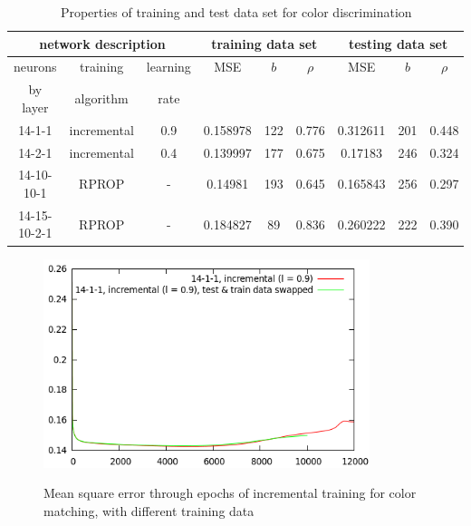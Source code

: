 \documentclass[times, utf8, zavrsni]{fer}
\begin{document}
\begin{table}[h]
\begin{center} {\footnotesize
\begin{tabular}{|c|c|c||c|c|c||c|c|c|}
\hline
\multicolumn{3}{|c||}{network description} & 
\multicolumn{3}{c||}{training data set} & 
\multicolumn{3}{c|}{testing data set} \\
\hline
neurons & training & learning & MSE & $b$ & $\rho$ & MSE & $b$ & $\rho$ \\ 
by layer & algorithm & rate    & & & & & & \\
\hline

14-1-1 & incremental & 0.9 & 
0.158978 & 122 & 0.776 & 
0.312611 & 201 & 0.448 \\

14-2-1 & incremental & 0.4 & 
0.139997 & 177 & 0.675 & 
0.17183 & 246 & 0.324 \\

14-10-10-1 & RPROP & - & 
0.14981 & 193 & 0.645 & 
0.165843 & 256 & 0.297 \\

14-15-10-2-1 & RPROP & - & 
0.184827 & 89 & 0.836 & 
0.260222 & 222 & 0.390 \\

\hline
\end{tabular} }
\end{center}
\caption{\footnotesize Properties of training and test data set for color
discrimination}
\label{table:color-training-results}
\end{table}

\begin{figure}[htb]
\caption{Mean square error through epochs of incremental training
for color matching, with different training data}
\centering
\includegraphics[width=0.85\textwidth]{images/color-train01-mse}
\label{fig:color-train-01-mse}
\end{figure}
\end{document}
